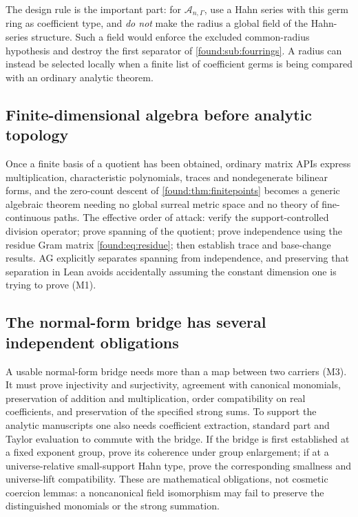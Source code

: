 \documentclass[11pt,letterpaper]{article}
\numberwithin{equation}{section}
\theoremstyle{definition}
\theoremstyle{remark}
\newcommand{\Ag}{\mathscr A}
\begin{document}
The design rule is the important part: for $\Ag_{n,\Gamma}$, use a Hahn series
with this germ ring as coefficient type, and \emph{do not} make the radius a
global field of the Hahn-series structure. Such a field would enforce the
excluded common-radius hypothesis and destroy the first separator of
\cref{found:sub:fourrings}. A radius can instead be selected locally when a
finite list of coefficient germs is being compared with an ordinary analytic
theorem.

\subsection{Finite-dimensional algebra before analytic topology}
\label{found:sub:finitefirst}
Once a finite basis of a quotient has been obtained, ordinary matrix APIs express
multiplication, characteristic polynomials, traces and nondegenerate bilinear
forms, and the zero-count descent of \cref{found:thm:finitepoints} becomes a
generic algebraic theorem needing no global surreal metric space and no theory of
fine-continuous paths. The effective order of attack: verify the
support-controlled division operator; prove spanning of the quotient; prove
independence using the residue Gram matrix \eqref{found:eq:residue}; then
establish trace and base-change results. AG explicitly separates spanning from
independence, and preserving that separation in Lean avoids accidentally assuming
the constant dimension one is trying to prove (M1).

\subsection{The normal-form bridge has several independent obligations}
\label{found:sub:bridge}
A usable normal-form bridge needs more than a map between two carriers (M3). It
must prove injectivity and surjectivity, agreement with canonical monomials,
preservation of addition and multiplication, order compatibility on real
coefficients, and preservation of the specified strong sums. To support the
analytic manuscripts one also needs coefficient extraction, standard part and
Taylor evaluation to commute with the bridge. If the bridge is first established
at a fixed exponent group, prove its coherence under group enlargement; if at a
universe-relative small-support Hahn type, prove the corresponding smallness and
universe-lift compatibility. These are mathematical obligations, not cosmetic
coercion lemmas: a noncanonical field isomorphism may fail to preserve the
distinguished monomials or the strong summation.
\end{document}
